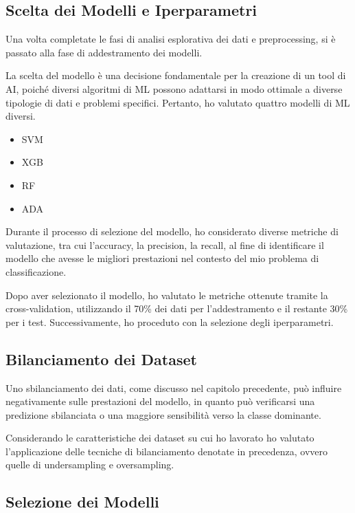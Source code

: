 \begin{flushleft}
\section{Scelta dei Modelli e Iperparametri}
 Una volta completate le fasi di analisi esplorativa dei dati e preprocessing, si è passato alla fase di addestramento dei modelli.

La scelta del modello è una decisione fondamentale per la creazione di un tool di AI, poiché diversi algoritmi di ML possono adattarsi in modo ottimale a diverse tipologie di dati e problemi specifici. Pertanto, ho valutato  quattro modelli di ML diversi.

\begin{itemize}
    \item SVM
    \item XGB
    \item RF
    \item ADA
\end{itemize}

Durante il processo di selezione del modello, ho considerato diverse metriche di valutazione, tra cui l'accuracy, la precision, la recall, al fine di identificare il modello che avesse le migliori prestazioni nel contesto del mio problema di classificazione.

Dopo aver selezionato il modello, ho valutato le metriche ottenute tramite la cross-validation, utilizzando il 70\% dei dati per l'addestramento e il restante 30\% per i test. Successivamente, ho proceduto con la selezione degli iperparametri.



\subsection{Bilanciamento dei Dataset}

Uno sbilanciamento dei dati, come discusso nel capitolo precedente, può influire negativamente sulle prestazioni del modello, in quanto può verificarsi una predizione sbilanciata o una maggiore sensibilità verso la classe dominante.

Considerando le caratteristiche dei dataset su cui ho lavorato ho valutato l'applicazione delle tecniche di bilanciamento denotate in precedenza, ovvero quelle di undersampling e oversampling.

\subsection{Selezione dei Modelli} 


\end{flushleft}
